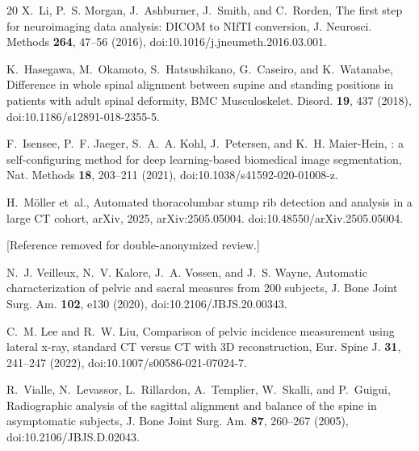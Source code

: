 \documentclass[aapm,mph,amsmath,amssymb,preprint,linenumbers]{revtex4-2}
\newif\ifreview \reviewtrue
\begin{document}
\begin{thebibliography}{20}
X.~Li, P.~S. Morgan, J.~Ashburner, J.~Smith, and C.~Rorden,
\newblock The first step for neuroimaging data analysis: {DICOM} to {NIfTI} conversion,
\newblock J. Neurosci. Methods {\bf 264}, 47--56 (2016),
\newblock doi:10.1016/j.jneumeth.2016.03.001.

K.~Hasegawa, M.~Okamoto, S.~Hatsushikano, G.~Caseiro, and K.~Watanabe,
\newblock Difference in whole spinal alignment between supine and standing positions in patients with adult spinal deformity,
\newblock BMC Musculoskelet. Disord. {\bf 19}, 437 (2018),
\newblock doi:10.1186/s12891-018-2355-5.

F.~Isensee, P.~F. Jaeger, S.~A.~A. Kohl, J.~Petersen, and K.~H. Maier-Hein,
: a self-configuring method for deep learning-based biomedical image segmentation,
\newblock Nat. Methods {\bf 18}, 203--211 (2021),
\newblock doi:10.1038/s41592-020-01008-z.

H.~M{\"o}ller et~al.,
\newblock Automated thoracolumbar stump rib detection and analysis in a large {CT} cohort,
\newblock arXiv, 2025,
\newblock arXiv:2505.05004. doi:10.48550/arXiv.2505.05004.

\ifreview
[Reference removed for double-anonymized review.]
\else
A.~Schehr, J.~Kim, and G.~Schwing,
\newblock {OpenSpineConsortium}: an open-source framework for medical student engagement in computational spine imaging research,
\newblock Cureus  (2026),
\newblock doi:10.7759/cureus.112661.
\fi

N.~J. Veilleux, N.~V. Kalore, J.~A. Vossen, and J.~S. Wayne,
\newblock Automatic characterization of pelvic and sacral measures from 200 subjects,
\newblock J. Bone Joint Surg. Am. {\bf 102}, e130 (2020),
\newblock doi:10.2106/JBJS.20.00343.

C.~M. Lee and R.~W. Liu,
\newblock Comparison of pelvic incidence measurement using lateral x-ray, standard {CT} versus {CT} with {3D} reconstruction,
\newblock Eur. Spine J. {\bf 31}, 241--247 (2022),
\newblock doi:10.1007/s00586-021-07024-7.

R.~Vialle, N.~Levassor, L.~Rillardon, A.~Templier, W.~Skalli, and P.~Guigui,
\newblock Radiographic analysis of the sagittal alignment and balance of the spine in asymptomatic subjects,
\newblock J. Bone Joint Surg. Am. {\bf 87}, 260--267 (2005),
\newblock doi:10.2106/JBJS.D.02043.


\end{thebibliography}
\end{document}
